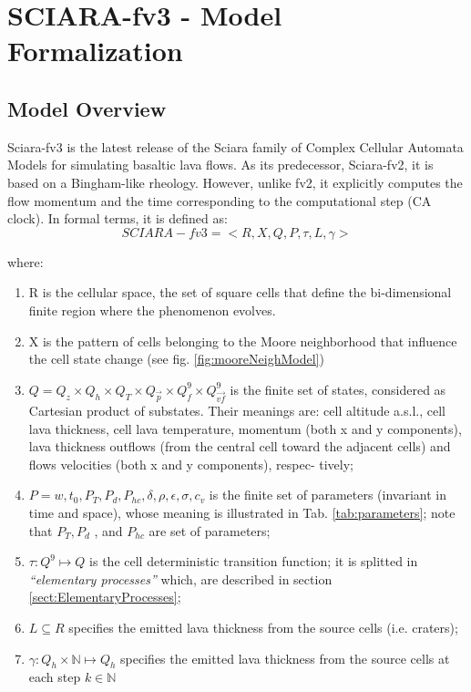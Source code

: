 \chapter{SCIARA-fv3 - Model Formalization}\label{sect:SCIARA_MODEL}

\section{Model Overview}
Sciara-fv3 is the latest release of the Sciara family of
Complex Cellular Automata Models for simulating basaltic
lava flows. As its predecessor, Sciara-fv2, it is
based on a Bingham-like rheology. However, unlike fv2, it explicitly
computes the flow momentum and the time corresponding
to the computational step (CA clock). In formal terms, it is
defined as:
\[
SCIARA-fv3=<R,X,Q,P,\tau,L,\gamma>
\]

where:

\begin{enumerate}
  \item R is the cellular space, the set of square cells that define the
  bi-dimensional finite region where the phenomenon evolves.
  \item X is the pattern of cells belonging to the Moore
neighborhood that influence the cell state change (see fig.
\ref{fig:mooreNeighModel})
  \item \(Q= Q_z \times Q_h  \times Q_T  \times  Q_{\overrightarrow{p}}  \times
  Q_f^9 \times  Q_{\overrightarrow{vf}}^9  \) is the finite set of states,
  considered as Cartesian product of substates. Their meanings are: cell altitude a.s.l.,
cell lava thickness, cell lava temperature, momentum
(both x and y components), lava thickness outflows
(from the central cell toward the adjacent cells) and
flows velocities (both x and y components), respec-
tively;
  \item \(P = w,t_0, P_T,P_d,P_{hc},\delta,\rho,\epsilon,\sigma,c_v\) is the finite set
of parameters (invariant in time and space), whose
meaning is illustrated in Tab. \ref{tab:parameters}; note that \(P_T , P_d\) ,
and \(P_{hc}\) are set of parameters;
\item \(\tau : Q^9 \longmapsto Q\) is the cell deterministic transition
function; it is splitted in \textit{``elementary processes''}  which, are described
in section \ref{sect:ElementaryProcesses};
\item \(L \subseteq R \) specifies the emitted lava thickness from the source
cells (i.e. craters);
\item \(\gamma : Q_h \times \mathbb{N} \longmapsto Q_h\) specifies the emitted
lava thickness from the source cells at each step \(k \in \mathbb{N}\)
  
\end{enumerate}

